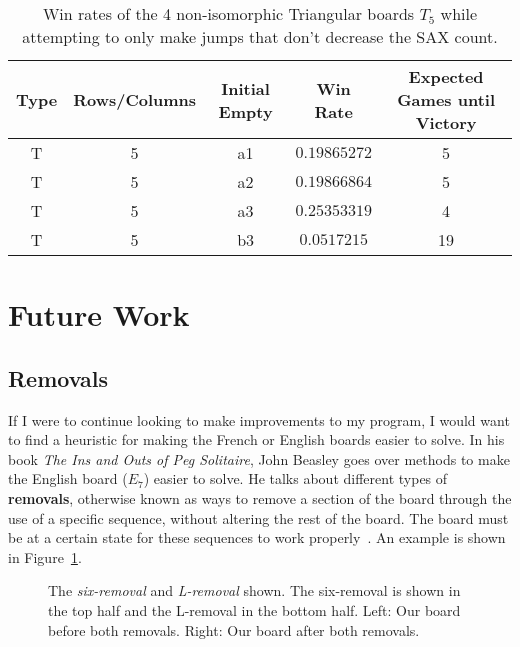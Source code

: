 \documentclass{article}
\begin{document}
\begin{table}[htb]
\begin{center} 
\begin{tabular}{ c  c  c  c  c }
\hline
\textbf{Type} & \textbf{Rows/Columns} &\textbf{Initial Empty} & \textbf{Win Rate} & \textbf{Expected Games until Victory}\\
\hline
T & 5 & a1 & $0.19865272$ & 5\\

T & 5 & a2 & $0.19866864$ & 5\\

T & 5 & a3 & $0.25353319$ & 4\\

T & 5 & b3 & $0.0517215$ & 19\\

\end{tabular}
\caption{Win rates of the 4 non-isomorphic Triangular boards $T_5$ while attempting to only make jumps that don't decrease the SAX count.}
\label{tab4}
\end{center} 
\end{table}

\section{Future Work}
\label{5FutureWork}
\subsection{Removals}
If I were to continue looking to make improvements to my program, I would want to find a heuristic for making the French or English boards easier to solve. In his book \textit{The Ins and Outs of Peg Solitaire}, John Beasley goes over methods to make the English board ($E_7$) easier to solve. He talks about different types of \textbf{removals}, otherwise known as ways to remove a section of the board through the use of a specific sequence, without altering the rest of the board. The board must be at a certain state for these sequences to work properly~\cite{Beasley}. An example is shown in Figure~\ref{fig10}.

\begin{figure}[htb]
\centering
{}
\caption{The \textit{six-removal} and \textit{L-removal} shown.  The six-removal is shown in the top half and the L-removal in the bottom half. Left:  Our board before both removals. Right: Our board after both removals.}
\label{fig10}
\end{figure}
\end{document}
